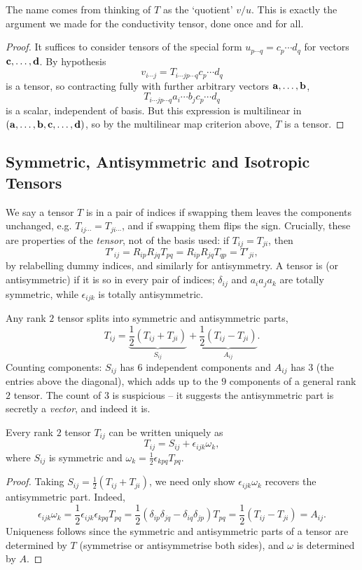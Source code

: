 \documentclass[a4paper]{scrartcl}
\begin{document}
The name comes from thinking of $T$ as the `quotient' $v/u$. This is exactly the argument we made for the conductivity tensor, done once and for all.

\begin{proof}
	It suffices to consider tensors of the special form $u_{p\cdots q} = c_p \cdots d_q$ for vectors $\mathbf{c}, \dots, \mathbf{d}$. By hypothesis
	$$
	v_{i \cdots j} = T_{i \cdots j p \cdots q} c_p \cdots d_q
	$$
	is a tensor, so contracting fully with further arbitrary vectors $\mathbf{a}, \dots, \mathbf{b}$,
	$$
	T_{i \cdots j p \cdots q} a_i \cdots b_j c_p \cdots d_q
	$$
	is a scalar, independent of basis. But this expression is multilinear in $(\mathbf{a}, \dots, \mathbf{b}, \mathbf{c}, \dots, \mathbf{d})$, so by the multilinear map criterion above, $T$ is a tensor.
\end{proof}

\subsection{Symmetric, Antisymmetric and Isotropic Tensors}

We say a tensor $T$ is  in a pair of indices if swapping them leaves the components unchanged, e.g. $T_{ij\cdots} = T_{ji \cdots}$, and  if swapping them flips the sign. Crucially, these are properties of the \emph{tensor}, not of the basis used: if $T_{ij} = T_{ji}$, then
$$
T'_{ij} = R_{ip}R_{jq}T_{pq} = R_{ip}R_{jq}T_{qp} = T'_{ji},
$$
by relabelling dummy indices, and similarly for antisymmetry. A tensor is  (or antisymmetric) if it is so in every pair of indices; $\delta_{ij}$ and $a_i a_j a_k$ are totally symmetric, while $\epsilon_{ijk}$ is totally antisymmetric.

Any rank $2$ tensor splits into symmetric and antisymmetric parts,
$$
T_{ij} = \underbrace{\frac{1}{2}(T_{ij} + T_{ji})}_{S_{ij}} + \underbrace{\frac{1}{2}(T_{ij} - T_{ji})}_{A_{ij}}.
$$
Counting components: $S_{ij}$ has $6$ independent components and $A_{ij}$ has $3$ (the entries above the diagonal), which adds up to the $9$ components of a general rank $2$ tensor. The count of $3$ is suspicious -- it suggests the antisymmetric part is secretly a \emph{vector}, and indeed it is.

\begin{proposition}
	Every rank $2$ tensor $T_{ij}$ can be written uniquely as
	$$
	T_{ij} = S_{ij} + \epsilon_{ijk} \omega_k,
	$$
	where $S_{ij}$ is symmetric and $\omega_k = \frac{1}{2}\epsilon_{kpq} T_{pq}$.
	\end{proposition}
\begin{proof}
	Taking $S_{ij} = \frac{1}{2}(T_{ij} + T_{ji})$, we need only show $\epsilon_{ijk}\omega_k$ recovers the antisymmetric part. Indeed,
	$$
	\epsilon_{ijk}\omega_k = \frac{1}{2}\epsilon_{ijk}\epsilon_{kpq} T_{pq} = \frac{1}{2}(\delta_{ip}\delta_{jq} - \delta_{iq}\delta_{jp}) T_{pq} = \frac{1}{2}(T_{ij} - T_{ji}) = A_{ij}.
	$$
	Uniqueness follows since the symmetric and antisymmetric parts of a tensor are determined by $T$ (symmetrise or antisymmetrise both sides), and $\omega$ is determined by $A$.
\end{proof}
\end{document}
